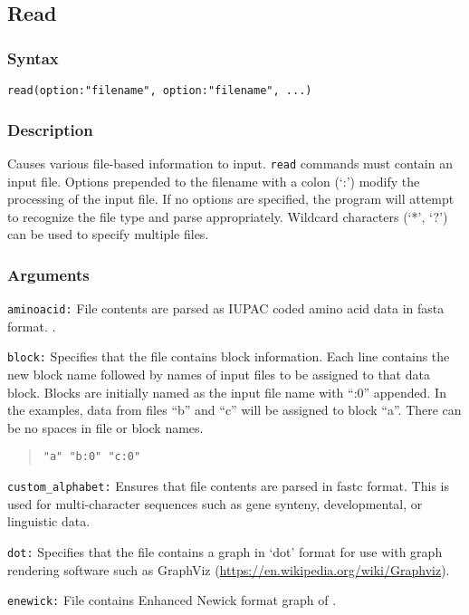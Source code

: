 \documentclass[11pt]{article}
\begin{document}
	\subsection{Read}
		\subsubsection{Syntax}
				\texttt{read(option:"filename", option:"filename", ...)}
			
		\subsubsection{Description}
		Causes various file-based information to input.  \texttt{read} commands must contain an input file.
		Options prepended to the filename with a colon (`:') modify the processing of the input file. If no options are specified, 
		the program will attempt to recognize the file type and parse appropriately.  Wildcard characters (`*', `?') can be used to specify multiple files.
		\subsubsection{Arguments}
			\noindent \texttt{aminoacid:} File contents are parsed as IUPAC coded amino acid data in fasta \citep{PearsonandLipman1988} format. .
		
			\smallskip		
			\noindent \texttt{block:} Specifies that the file contains block information. Each line contains 
			the new block name followed by names of input files to be assigned to that data block.  
			Blocks are initially named as the input file name with ``:0'' appended.  
			In the examples, data from files ``b'' and ``c'' will be assigned to block ``a''.  There can be no spaces in file or block names.
			\begin{quote}
				\texttt{"a" "b:0" "c:0"}\\
			\end{quote}
			
			\smallskip		
			\noindent \texttt{custom\_alphabet:} Ensures that file contents are parsed in fastc \citep{WheelerandWashburn2019} format. This is used for multi-character sequences such as gene synteny, developmental,  or linguistic  data.
			
			\smallskip		
			\noindent \texttt{dot:} Specifies that the file contains a graph in `dot' format for use with graph rendering software such as GraphViz (\url{https://en.wikipedia.org/wiki/Graphviz}).
			
			\smallskip		
			\noindent \texttt{enewick:} File contains Enhanced Newick format graph of \cite{Cardonaetal2008}.
			
\end{document}
